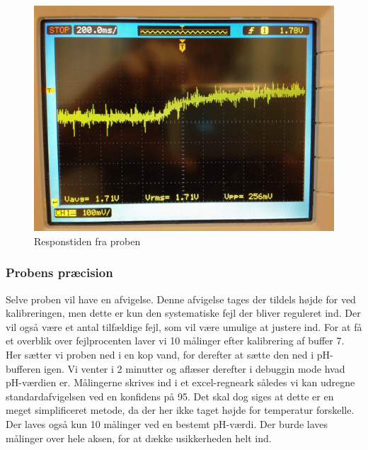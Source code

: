  \begin{figure}[H]
	\centering 
	\includegraphics[scale=0.8]{HardwareArkitektur/Sensore/pH_probe_billeder/respons.png}
	\caption{Responstiden fra proben}
	\label{photo:respons}
\end{figure} 

\subsubsection{Probens præcision}
Selve proben vil have en afvigelse. Denne afvigelse tages der tildels højde for ved kalibreringen, men dette er kun den systematiske fejl der bliver reguleret ind. Der vil også være et antal tilfældige fejl, som vil være umulige at justere ind. For at få et overblik over fejlprocenten laver vi 10 målinger efter kalibrering af buffer 7. Her sætter vi proben ned i en kop vand, for derefter at sætte den ned i pH-bufferen igen. Vi venter i 2 minutter og aflæser derefter i debuggin mode hvad pH-værdien er. Målingerne skrives ind i et excel-regneark således vi kan udregne standardafvigelsen ved en konfidens på 95. Det skal dog siges at dette er en meget simplificeret metode, da der her ikke taget højde for temperatur forskelle. Der laves også kun 10 målinger ved en bestemt pH-værdi. Der burde laves målinger over hele aksen, for at dække usikkerheden helt ind.    

